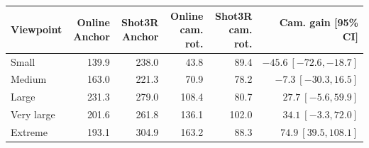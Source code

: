\begin{tabular}{lrrrrr}
\toprule
Viewpoint & Online Anchor & Shot3R Anchor & Online cam. rot. & Shot3R cam. rot. & Cam. gain [95\% CI] \\
\midrule
Small & 139.9 & 238.0 & 43.8 & 89.4 & $-45.6\ [-72.6,-18.7]$ \\
Medium & 163.0 & 221.3 & 70.9 & 78.2 & $-7.3\ [-30.3,16.5]$ \\
Large & 231.3 & 279.0 & 108.4 & 80.7 & $27.7\ [-5.6,59.9]$ \\
Very large & 201.6 & 261.8 & 136.1 & 102.0 & $34.1\ [-3.3,72.0]$ \\
Extreme & 193.1 & 304.9 & 163.2 & 88.3 & $74.9\ [39.5,108.1]$ \\
\bottomrule
\end{tabular}
